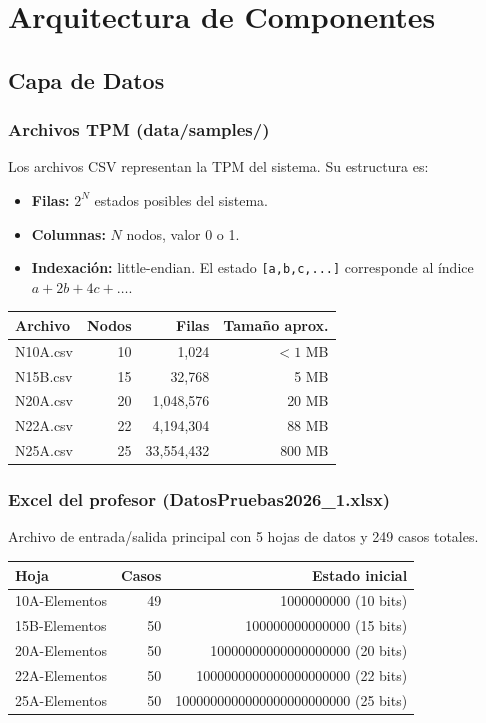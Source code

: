 \documentclass[12pt,a4paper]{article}
\begin{document}
\section{Arquitectura de Componentes}

\subsection{Capa de Datos}

\subsubsection{Archivos TPM (data/samples/) }
Los archivos CSV representan la TPM del sistema. Su estructura es:
\begin{itemize}
    \item \textbf{Filas:} $2^N$ estados posibles del sistema.
    \item \textbf{Columnas:} $N$ nodos, valor 0 o 1.
    \item \textbf{Indexación:} little-endian. El estado \texttt{[a,b,c,...]} corresponde al índice $a + 2b + 4c + \ldots$.
\end{itemize}

\begin{longtable}{lrrr}
    \toprule
    Archivo & Nodos & Filas & Tamaño aprox. \\
    \midrule
    \endhead
    N10A.csv & 10 & 1,024     & $<1$ MB \\
    N15B.csv & 15 & 32,768    & 5 MB \\
    N20A.csv & 20 & 1,048,576 & 20 MB \\
    N22A.csv & 22 & 4,194,304 & 88 MB \\
    N25A.csv & 25 & 33,554,432 & 800 MB \\
    \bottomrule
\end{longtable}

\subsubsection{Excel del profesor (DatosPruebas2026\_1.xlsx)}
Archivo de entrada/salida principal con 5 hojas de datos y 249 casos totales.

\begin{longtable}{lrr}
    \toprule
    Hoja & Casos & Estado inicial \\
    \midrule
    \endhead
    10A-Elementos & 49 & 1000000000 (10 bits) \\
    15B-Elementos & 50 & 100000000000000 (15 bits) \\
    20A-Elementos & 50 & 10000000000000000000 (20 bits) \\
    22A-Elementos & 50 & 1000000000000000000000 (22 bits) \\
    25A-Elementos & 50 & 1000000000000000000000000 (25 bits) \\
    \bottomrule
\end{longtable}
\end{document}
